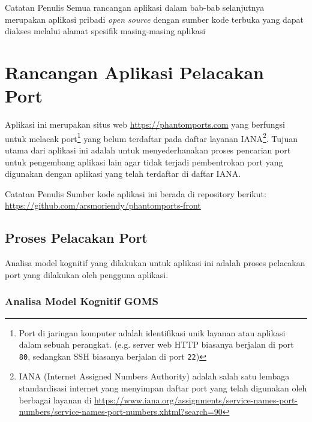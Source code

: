 \maketitle

\begin{info}{Catatan Penulis}
  Semua rancangan aplikasi dalam bab-bab selanjutnya merupakan
  aplikasi pribadi \textit{open source} dengan sumber kode terbuka
  yang dapat diakses melalui alamat spesifik masing-masing aplikasi
\end{info}

\section{Rancangan Aplikasi Pelacakan Port}

Aplikasi ini merupakan situs web \url{https://phantomports.com} yang
berfungsi untuk melacak port\footnote{
  Port di jaringan komputer adalah identifikasi unik layanan atau
  aplikasi dalam sebuah perangkat. (e.g. server web HTTP biasanya
    berjalan di port \texttt{80}, sedangkan SSH biasanya berjalan di
  port \texttt{22})
}
yang belum terdaftar pada daftar layanan IANA\footnote{
  IANA (Internet Assigned Numbers Authority) adalah salah satu
  lembaga standardisasi internet yang  menyimpan daftar port yang
  telah digunakan oleh berbagai layanan di
  \url{https://www.iana.org/assignments/service-names-port-numbers/service-names-port-numbers.xhtml?search=90}
}. Tujuan utama dari aplikasi ini adalah untuk menyederhanakan proses
pencarian port untuk pengembang aplikasi lain agar tidak terjadi
pembentrokan port yang digunakan dengan aplikasi yang telah terdaftar
di daftar IANA.

\begin{info}{Catatan Penulis}
  Sumber kode aplikasi ini berada di repository berikut:
  \url{https://github.com/arsmoriendy/phantomports-front}
\end{info}

\subsection{Proses Pelacakan Port}
Analisa model kognitif yang dilakukan untuk aplikasi ini adalah
proses pelacakan port yang dilakukan oleh pengguna aplikasi.

\clearpage
\subsubsection{Analisa Model Kognitif GOMS}

